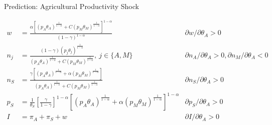     \begin{frame}{Prediction: Agricultural Productivity Shock}

        {\footnotesize
        \begin{align*}
            w &= \frac{\alpha \left[ (p_A\theta_A)^{\frac{1}{1-\alpha}} + C(p_M\theta_M)^{\frac{1}{1-\alpha}} \right]^{1-\alpha}}{(1-\gamma)^{1-\alpha}} & \partial w/\partial \theta_A >0\\
            n_j &= \frac{(1-\gamma)(p_j\theta_j)^{\frac{1}{1-\alpha}}}{(p_A\theta_A)^{\frac{1}{1-\alpha}} + C(p_M\theta_M)^{\frac{1}{1-\alpha}}},\ j\in\{A,M\} & \partial n_A/\partial \theta_A>0,\partial n_M/\partial \theta_A<0 \\
            n_S &= \frac{\gamma \left[ (p_A\theta_A)^{\frac{1}{1-\alpha}} + \alpha(p_M\theta_M)^{\frac{1}{1-\alpha}} \right]}{(p_A\theta_A)^{\frac{1}{1-\alpha}} + C(p_M\theta_M)^{\frac{1}{1-\alpha}}} & \partial n_S/\partial \theta_A>0\\
            p_S &= \frac{1}{\theta_S}\left[\frac{\gamma}{1-\gamma}\right]^{1-\alpha} \left[ (p_A\theta_A)^{\frac{1}{1-\alpha}} + \alpha(p_M\theta_M)^{\frac{1}{1-\alpha}} \right]^{1-\alpha} & \partial p_S/\partial \theta_A>0\\
            I &= \pi_A+\pi_S+w &\partial I/\partial \theta_A >0
        \end{align*}}
        
    \end{frame}

